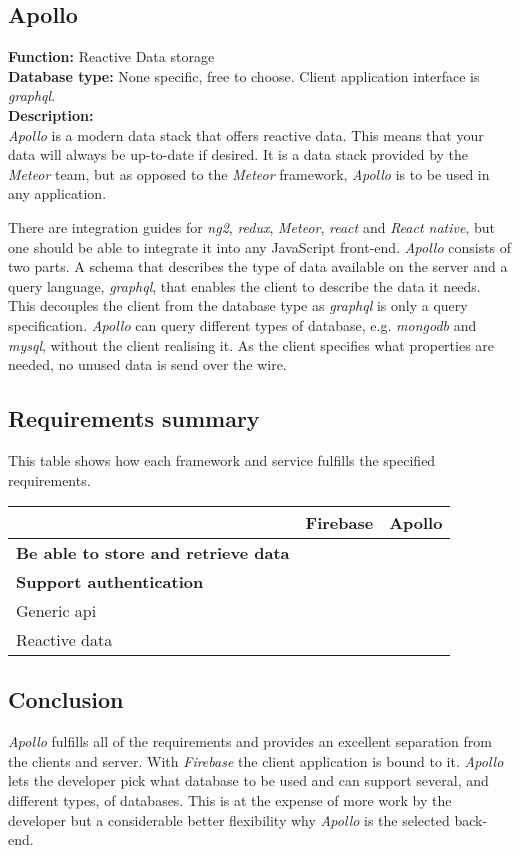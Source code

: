 \subsection*{Apollo}
\textbf{Function:} Reactive Data storage
\\
\textbf{Database type:} None specific, free to choose.
Client application interface is \textit{\gls{graphql}}.
\\
\textbf{Description:}
\\
\textit{Apollo} is a modern data stack that offers reactive data. 
This means that your data will always be up-to-date if desired.
It is a data stack provided by the \textit{Meteor} team, but as opposed to the \textit{Meteor} framework, \textit{Apollo} is to be used in any application. 

There are integration guides for \textit{\gls{ng2}}, \textit{\gls{redux}}, \textit{Meteor}, \textit{\gls{react}} and \textit{React native}, but one should be able to integrate it into any JavaScript front-end.
\textit{Apollo} consists of two parts. 
A schema that describes the type of data available on the server and a query language, \textit{\gls{graphql}}, that enables the client to describe the data it needs. 
This decouples the client from the database type as \textit{\gls{graphql}} is only a query specification.
\textit{Apollo} can query different types of database, e.g. \textit{\gls{mongodb}} and \textit{\gls{mysql}}, without the client realising it.
As the client specifies what properties are needed, no unused data is send over the wire.

\subsection*{Requirements summary}
This table shows how each framework and service fulfills the specified requirements.
	
	\begin{tabularx}{\textwidth}{|l|C C|}
	\hline 
	 & Firebase & Apollo \\ 
	\hline 
	\textbf{Be able to store and retrieve data} & \cmark & \cmark \\ 
	\hline
	\textbf{Support authentication} & \cmark & \cmark \\ 
	\hline 
	Generic \gls{api} & \xmark & \cmark \\ 
	\hline 
	Reactive data & \cmark & \cmark \\ 
	\hline 	
	\end{tabularx} 
	
\subsection*{Conclusion}
\textit{Apollo} fulfills all of the requirements and provides an excellent separation from the clients and server.
With \textit{Firebase} the client application is bound to it. 
\textit{Apollo} lets the developer pick what database to be used and can support several, and different types, of databases. 
This is at the expense of more work by the developer but a considerable better flexibility why \textit{Apollo} is the selected back-end.